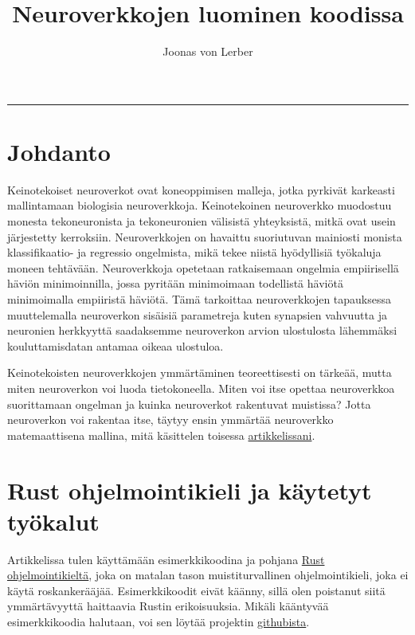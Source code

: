 \documentclass{article}
\author{Joonas von Lerber}
\title{Neuroverkkojen luominen koodissa}
\begin{document}
\maketitle

\tableofcontents

\vskip15pt
\hrule
\vskip15pt

\section{Johdanto}

Keinotekoiset neuroverkot ovat koneoppimisen malleja, jotka pyrkivät karkeasti mallintamaan biologisia neuroverkkoja.
Keinotekoinen neuroverkko muodostuu monesta tekoneuronista ja tekoneuronien välisistä yhteyksistä, mitkä ovat usein
järjestetty kerroksiin. Neuroverkkojen on havaittu suoriutuvan mainiosti monista klassifikaatio- ja regressio ongelmista,
mikä tekee niistä hyödyllisiä työkaluja moneen tehtävään. Neuroverkkoja opetetaan ratkaisemaan ongelmia empiirisellä
häviön minimoinnilla\cite{vapnik1999nature}, jossa pyritään minimoimaan todellistä häviötä minimoimalla empiiristä häviötä.
Tämä tarkoittaa neuroverkkojen tapauksessa muuttelemalla neuroverkon sisäisiä parametreja kuten synapsien vahvuutta ja neuronien
herkkyyttä saadaksemme neuroverkon arvion ulostulosta lähemmäksi kouluttamisdatan antamaa oikeaa ulostuloa.

Keinotekoisten neuroverkkojen ymmärtäminen teoreettisesti on tärkeää, mutta miten neuroverkon voi luoda tietokoneella.
Miten voi itse opettaa neuroverkkoa suorittamaan ongelman ja kuinka neuroverkot rakentuvat muistissa? %
Jotta neuroverkon voi rakentaa itse, täytyy ensin ymmärtää neuroverkko matemaattisena mallina, mitä käsittelen toisessa \href{http://example.com}{artikkelissani}. %

\section{Rust ohjelmointikieli ja käytetyt työkalut}

Artikkelissa tulen käyttämään esimerkkikoodina ja pohjana \href{https://www.rust-lang.org/}{Rust ohjelmointikieltä}, joka on matalan tason muistiturvallinen ohjelmointikieli, joka ei käytä roskankerääjää. %
Esimerkkikoodit eivät käänny, sillä olen poistanut siitä ymmärtävyyttä haittaavia Rustin erikoisuuksia. Mikäli kääntyvää esimerkkikoodia halutaan,
voi sen löytää projektin \href{https://github.com/Joonas-vonlerber/rusticneurons}{githubista}.
\end{document}
